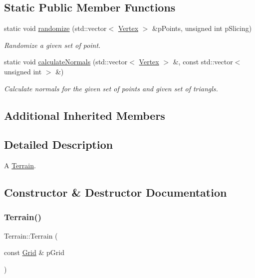 \subsection*{Static Public Member Functions}
\begin{DoxyCompactItemize}
\item 
static void \hyperlink{classTerrain_a9fa2515b7c84025c74c97af9b3fee30f}{randomize} (std\+::vector$<$ \hyperlink{structVertex}{Vertex} $>$ \&p\+Points, unsigned int p\+Slicing)
\begin{DoxyCompactList}\small\item\em Randomize a given set of point. \end{DoxyCompactList}\item 
static void \hyperlink{classTerrain_aa6063c2dfbed2fbba76800687288f24e}{calculate\+Normals} (std\+::vector$<$ \hyperlink{structVertex}{Vertex} $>$ \&, const std\+::vector$<$ unsigned int $>$ \&)
\begin{DoxyCompactList}\small\item\em Calculate normals for the given set of points and given set of triangls. \end{DoxyCompactList}\end{DoxyCompactItemize}
\subsection*{Additional Inherited Members}


\subsection{Detailed Description}
A \hyperlink{classTerrain}{Terrain}. 

\subsection{Constructor \& Destructor Documentation}
\mbox{\label{classTerrain_afafc221c37b67156d8dedeeee5f9f0e5}} 
\subsubsection{\texorpdfstring{Terrain()}{Terrain()}}
{\footnotesize\ttfamily Terrain\+::\+Terrain (\begin{DoxyParamCaption}\item[{const \hyperlink{classGrid}{Grid} \&}]{p\+Grid }\end{DoxyParamCaption})}



